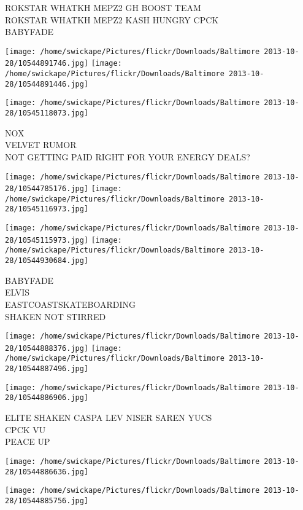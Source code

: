 \documentclass[10pt,letterpaper]{article}
\begin{document}
ROKSTAR WHATKH MEPZ2 GH BOOST TEAM\\
ROKSTAR WHATKH MEPZ2 KASH HUNGRY CPCK\\
BABYFADE
\pagebreak

\texttt{[image: /home/swickape/Pictures/flickr/Downloads/Baltimore 2013-10-28/10544891746.jpg]}
\texttt{[image: /home/swickape/Pictures/flickr/Downloads/Baltimore 2013-10-28/10544891446.jpg]}

\vspace{0.25in}
\texttt{[image: /home/swickape/Pictures/flickr/Downloads/Baltimore 2013-10-28/10545118073.jpg]}

NOX\\
VELVET RUMOR\\
NOT GETTING PAID RIGHT FOR YOUR ENERGY DEALS?
\pagebreak

\texttt{[image: /home/swickape/Pictures/flickr/Downloads/Baltimore 2013-10-28/10544785176.jpg]}
\texttt{[image: /home/swickape/Pictures/flickr/Downloads/Baltimore 2013-10-28/10545116973.jpg]}

\texttt{[image: /home/swickape/Pictures/flickr/Downloads/Baltimore 2013-10-28/10545115973.jpg]}
\texttt{[image: /home/swickape/Pictures/flickr/Downloads/Baltimore 2013-10-28/10544930684.jpg]}

BABYFADE\\
ELVIS\\
EASTCOASTSKATEBOARDING\\
SHAKEN NOT STIRRED
\pagebreak

\texttt{[image: /home/swickape/Pictures/flickr/Downloads/Baltimore 2013-10-28/10544888376.jpg]}
\texttt{[image: /home/swickape/Pictures/flickr/Downloads/Baltimore 2013-10-28/10544887496.jpg]}

\texttt{[image: /home/swickape/Pictures/flickr/Downloads/Baltimore 2013-10-28/10544886906.jpg]}

ELITE SHAKEN CASPA LEV NISER SAREN YUCS\\
CPCK VU\\
PEACE UP
\pagebreak

\texttt{[image: /home/swickape/Pictures/flickr/Downloads/Baltimore 2013-10-28/10544886636.jpg]}

\vspace{0.25in}
\texttt{[image: /home/swickape/Pictures/flickr/Downloads/Baltimore 2013-10-28/10544885756.jpg]}
\end{document}
